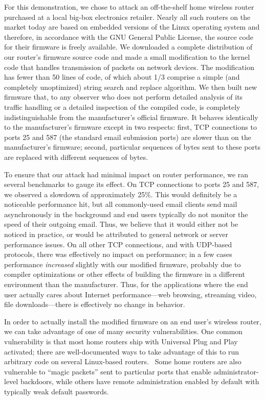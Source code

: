 \documentclass{article}
\begin{document}
For this demonstration, we chose to attack an off-the-shelf home
wireless router purchased at a local big-box electronics
retailer. Nearly all such routers on the market today are based on
embedded versions of the Linux operating system and therefore, in
accordance with the GNU General Public License, the source code for
their firmware is freely available. We downloaded a complete
distribution of our router's firmware source code and made a small
modification to the kernel code that handles transmission of packets
on network devices. The modification has fewer than 50 lines of code,
of which about 1/3 comprise a simple (and completely unoptimized)
string search and replace algorithm. We then built new firmware that,
to any observer who does not perform detailed analysis of its traffic
handling or a detailed inspection of the compiled code, is completely
indistinguishable from the manufacturer's official firmware. It
behaves identically to the manufacturer's firmware except in two
respects: first, TCP connections to ports 25 and 587 (the standard
email submission ports) are slower than on the manufacturer's
firmware; second, particular sequences of bytes sent to these ports
are replaced with different sequences of bytes.

To ensure that our attack had minimal impact on router performance, we
ran several benchmarks to gauge its effect. On TCP connections to
ports 25 and 587, we observed a slowdown of approximately 25\%. This
would definitely be a noticeable performance hit, but all
commonly-used email clients send mail asynchronously in the background
and end users typically do not monitor the speed of their outgoing
email. Thus, we believe that it would either not be noticed in
practice, or would be attributed to general network or server
performance issues. On all other TCP connections, and with UDP-based
protocols, there was effectively no impact on performance; in a few
cases performance \emph{increased} slightly with our modified
firmware, probably due to compiler optimizations or other effects of
building the firmware in a different environment than the
manufacturer. Thus, for the applications where the end user actually
cares about Internet performance---web browsing, streaming video, file
downloads---there is effectively no change in behavior.

In order to actually install the modified firmware on an end user's
wireless router, we can take advantage of one of many security
vulnerabilities. One common vulnerability is that most home routers
ship with Universal Plug and Play activated; there are well-documented
ways to take advantage of this to run arbitrary code on several
Linux-based routers.~\cite{UPnP} Some home routers are also vulnerable
to ``magic packets'' sent to particular ports that enable
administrator-level backdoors, while others have remote administration
enabled by default with typically weak default passwords.
\end{document}
